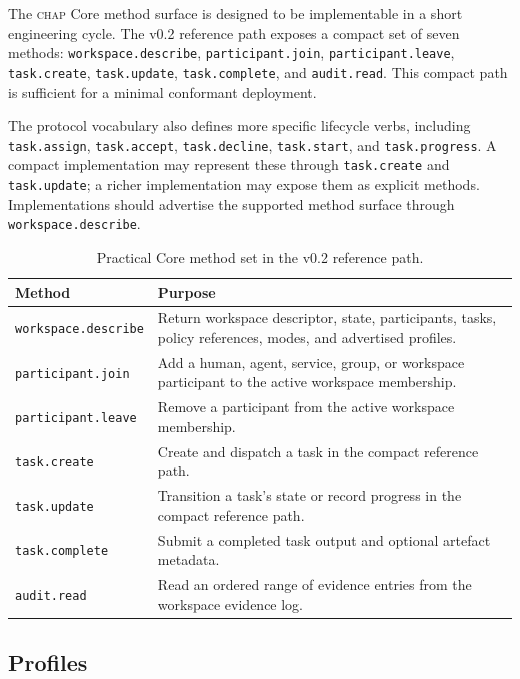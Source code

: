 \documentclass[11pt]{article}
\newcommand{\chap}{\textsc{chap}}
\begin{document}
The \chap{} Core method surface is designed to be implementable in a short engineering cycle. The v0.2 reference path exposes a compact set of seven methods: \texttt{workspace.describe}, \texttt{participant.join}, \texttt{participant.leave}, \texttt{task.create}, \texttt{task.update}, \texttt{task.complete}, and \texttt{audit.read}. This compact path is sufficient for a minimal conformant deployment.

The protocol vocabulary also defines more specific lifecycle verbs, including \texttt{task.assign}, \texttt{task.accept}, \texttt{task.decline}, \texttt{task.start}, and \texttt{task.progress}. A compact implementation may represent these through \texttt{task.create} and \texttt{task.update}; a richer implementation may expose them as explicit methods. Implementations should advertise the supported method surface through \texttt{workspace.describe}.

\begin{table}[h]
\centering
\caption{Practical Core method set in the v0.2 reference path.}
\label{tab:core-methods}
\begin{tabularx}{\textwidth}{@{}p{4.3cm}X@{}}
\toprule
\textbf{Method} & \textbf{Purpose} \\
\midrule
\texttt{workspace.describe} & Return workspace descriptor, state, participants, tasks, policy references, modes, and advertised profiles. \\
\texttt{participant.join} & Add a human, agent, service, group, or workspace participant to the active workspace membership. \\
\texttt{participant.leave} & Remove a participant from the active workspace membership. \\
\texttt{task.create} & Create and dispatch a task in the compact reference path. \\
\texttt{task.update} & Transition a task's state or record progress in the compact reference path. \\
\texttt{task.complete} & Submit a completed task output and optional artefact metadata. \\
\texttt{audit.read} & Read an ordered range of evidence entries from the workspace evidence log. \\
\bottomrule
\end{tabularx}
\end{table}

\subsection{Profiles}
\end{document}
